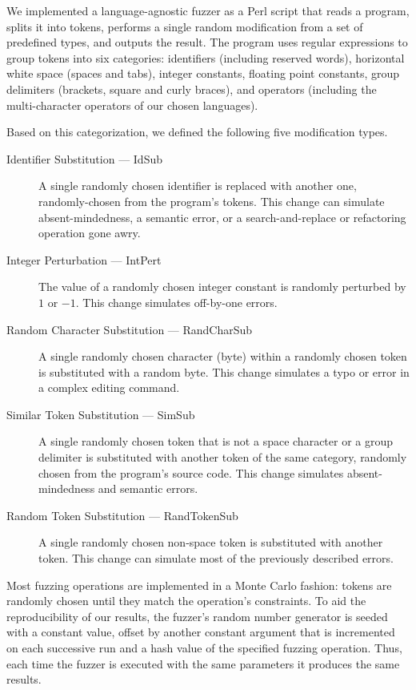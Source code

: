 \documentclass[10pt]{sigplanconf}
\begin{document}
We implemented a language-agnostic fuzzer as a Perl script
that reads a program,
splits it into tokens,
performs a single random modification from a set of
predefined types,
and outputs the result.
The program uses regular expressions to group tokens into
six categories:
identifiers (including reserved words),
horizontal white space (spaces and tabs),
integer constants,
floating point constants,
group delimiters (brackets, square and curly braces), and
operators (including the multi-character operators of our chosen languages).

Based on this categorization,
we defined the following five modification types.
\begin{description}
\item [Identifier Substitution --- IdSub]
A single randomly chosen identifier is replaced with another one,
randomly-chosen from the program's tokens.
This change can simulate absent-mindedness, a semantic error, or
a search-and-replace or refactoring operation gone awry.
\item [Integer Perturbation --- IntPert]
The value of a randomly chosen integer constant
is randomly perturbed by $1$ or $-1$.
This change simulates off-by-one errors.
\item [Random Character Substitution --- RandCharSub]
A single randomly chosen character (byte) within a randomly chosen token
is substituted with a random byte.
This change simulates a typo or error in a complex editing command.
\item [Similar Token Substitution --- SimSub]
A single randomly chosen token
that is not a space character or a group delimiter
is substituted with another token of the same category,
randomly chosen from the program's source code.
This change simulates absent-mindedness and semantic errors.
\item [Random Token Substitution --- RandTokenSub]
A single randomly chosen non-space token
is substituted with another token.
This change can simulate most of the previously described errors.
\end{description}

Most fuzzing operations are implemented in a Monte Carlo fashion:
tokens are randomly chosen until they match the operation's constraints.
To aid the reproducibility of our results,
the fuzzer's random number generator is seeded with a constant value,
offset by another constant argument that is incremented on each successive run
and a hash value of the specified fuzzing operation.
Thus, each time the fuzzer is executed with the same parameters it
produces the same results.
\end{document}
